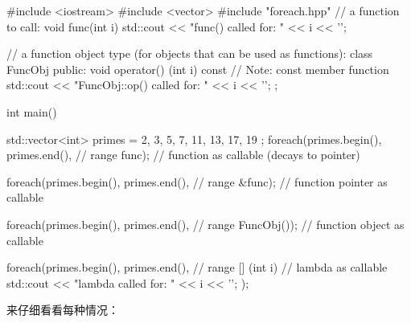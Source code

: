 \begin{cpp}
#include <iostream>
#include <vector>
#include "foreach.hpp"
// a function to call:
void func(int i)
{
	std::cout << "func() called for: " << i << '\n';
}

// a function object type (for objects that can be used as functions):
class FuncObj {
	public:
	void operator() (int i) const { // Note: const member function
		std::cout << "FuncObj::op() called for: " << i << '\n';
	}
};

int main()
{
	std::vector<int> primes = { 2, 3, 5, 7, 11, 13, 17, 19 };
	foreach(primes.begin(), primes.end(), // range
			func); // function as callable (decays to pointer)

	foreach(primes.begin(), primes.end(), // range
			&func); // function pointer as callable

	foreach(primes.begin(), primes.end(), // range
			FuncObj()); // function object as callable

	foreach(primes.begin(), primes.end(), // range
			[] (int i) { // lambda as callable
				std::cout << "lambda called for: " << i << '\n';
			});
}
\end{cpp}

来仔细看看每种情况：

